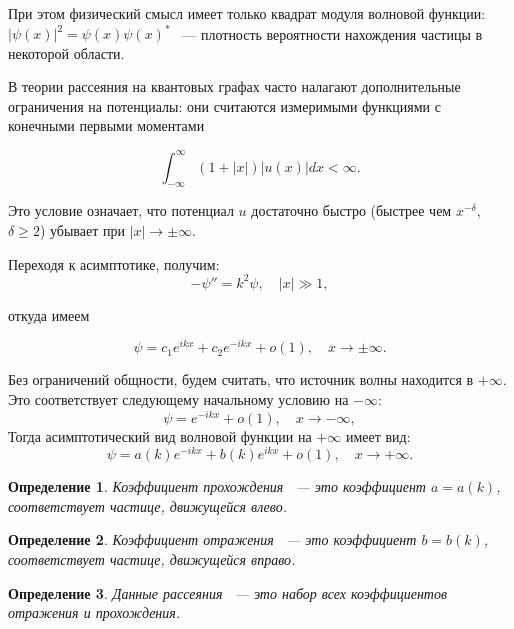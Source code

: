 \documentclass[a4 paper, 12 pt]{extarticle}
\newtheorem{Def}{Определение}[section]
\begin{document}
   При этом физический смысл имеет только квадрат модуля волновой функции: \linebreak $\left|\psi\left(x\right)\right|^2 = \psi\left(x\right) \psi\left(x\right)^*$ ~--- плотность вероятности нахождения частицы в некоторой области.
   
   В теории рассеяния на квантовых графах часто налагают дополнительные ограничения на потенциалы: они считаются измеримыми функциями с конечными первыми моментами
   
   \begin{equation*}
   \int_{-\infty}^{\infty}(1+|x|)|u(x)|dx<\infty.
   \end{equation*}
   
   Это условие означает, что потенциал $u$
   достаточно быстро (быстрее чем $x^{-\delta}$, $\delta\geq2$)
   убывает при $|x|\rightarrow\pm\infty$.
   
   Переходя к асимптотике, получим:
   $$
   -\psi''=k^2\psi, \quad |x|\gg1,
   $$

   откуда имеем
   
   $$
   \psi=c_1e^{ikx}+c_2e^{-ikx}+o(1), \quad x\rightarrow\pm\infty.
   $$
   
   Без ограничений общности, будем считать, что источник волны находится в $+\infty$. Это соответствует следующему начальному условию на $-\infty$:
   \begin{equation}\label{SchredBorderMInf}
   \psi=e^{-ikx}+o(1), \quad x\rightarrow-\infty,
   \end{equation}
   Тогда асимптотический вид волновой функции на $+\infty$ имеет вид:
   \begin{equation}\label{SchredBorderPInf}
   \psi=a(k)e^{-ikx}+b(k)e^{ikx}+o(1), \quad
   x\rightarrow+\infty.
   \end{equation}
   
   \begin{Def}
   	Коэффициент прохождения ~--- это коэффициент $a = a\left(k\right)$, соответствует частице, движущейся влево.
   \end{Def}

   \begin{Def}
   	Коэффициент отражения ~--- это коэффициент $b = b\left(k\right)$, соответствует частице, движущейся вправо.
   \end{Def}

   \begin{Def}
   Данные рассеяния ~--- это набор всех коэффициентов отражения и прохождения.
   \end{Def}
\end{document}
